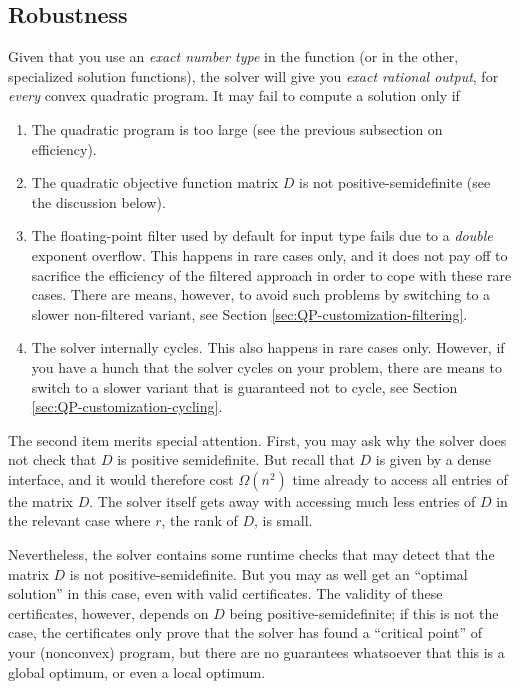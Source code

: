 \subsection{Robustness\label{sec:QP-robustness}}
Given that you use an \emph{exact number type} in the function
 (or in the other, specialized 
solution functions),  the solver
will give you \emph{exact rational output}, for \emph{every}
convex quadratic program. It may fail to compute a solution only if
\begin{enumerate}
\item The quadratic program is too large (see the previous subsection 
on efficiency).
\item The quadratic objective function matrix $D$ is not 
positive-semidefinite (see the discussion below).
\item The floating-point filter used by default for input type
 fails due to a \emph{double} exponent overflow. This 
happens in rare cases only, and it does not pay off to sacrifice
the efficiency of the filtered approach in order to cope with these
rare cases. There are means, however, to avoid such
problems by switching to a slower non-filtered variant, see
Section  \ref{sec:QP-customization-filtering}.
\item The solver internally cycles. This also happens in rare
cases only. However, if
you have a hunch that the solver cycles on your problem,
there are means to switch to a slower variant that is guaranteed
not to cycle, see Section \ref{sec:QP-customization-cycling}.
\end{enumerate}

The second item merits special attention. First, you may ask why the
solver does not check that $D$ is positive semidefinite. But recall
that $D$ is given by a dense interface, and it would therefore cost
$\Omega(n^2)$ time already to access all entries of the matrix $D$.
The solver itself gets away with accessing much less entries of 
$D$ in the relevant case where $r$, the rank of $D$, is small.

Nevertheless, the solver contains some runtime checks
that may detect that the matrix $D$ is not positive-semidefinite. But
you may as well get an ``optimal solution'' in this case, even with
valid certificates. The validity of these certificates, however, 
depends on $D$ being positive-semidefinite; if this is not the case, the
certificates only prove that the solver has found a ``critical point'' of
your (nonconvex) program, but there are no guarantees whatsoever that
this is a global optimum, or even a local optimum.


